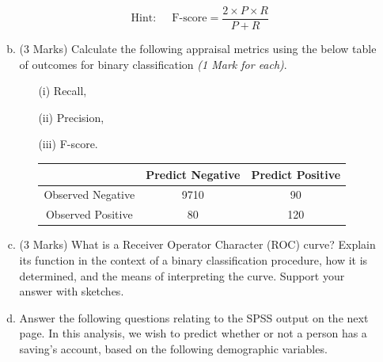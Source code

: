 \documentclass[a4paper,12pt]{article}
\begin{document}
\begin{enumerate}
\begin{enumerate}[(a)]
		\[ \mbox{Hint:    }\;\;\;\; \mbox{F-score} = \frac{2\times P \times R}{P + R} \]
		
\bigskip		
\item (3 Marks) Calculate the following appraisal metrics using the below table of outcomes for binary classification \textit{(1 Mark for each)}.
\begin{itemize}	
		\item[(i)] 	Recall,
		\item[(ii)] Precision,
		\item[(iii)] F-score.
\smallskip
\begin{center}
	\begin{tabular}{|c|c|c|}
		\hline  & \phantom{spa}Predict Negative\phantom{spa} & \phantom{spa}Predict Positive\phantom{spa} \\ 
		\hline\phantom{spa} Observed Negative \phantom{spa}&	9710	&	90	\\ 
		\hline \phantom{spa}Observed Positive\phantom{spa} & 	80	&	120	\\ 
		\hline 
	\end{tabular} 
\end{center}	
		\end{itemize}
	
			
\bigskip
		\item (3 Marks) What is a Receiver Operator Character (ROC) curve? Explain its function in the context of a binary classification procedure, how it is determined, and the means of interpreting the curve. Support your answer with sketches.	
	
\bigskip 


\item Answer the following questions relating to the SPSS output on the next page. In this analysis, we wish to predict whether or not a person has a saving's account, based on the following demographic variables.


\end{enumerate}
\end{enumerate}
\end{document}
